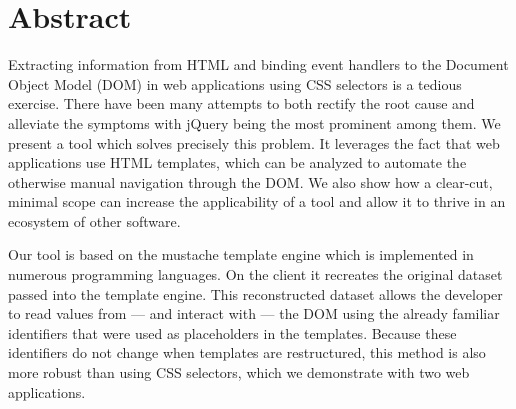 \documentclass[thesis.tex]{subfiles}
\begin{document}
\chapter*{Abstract}
\label{chap:abstract}

Extracting information from HTML and binding event handlers to the
Document Object Model (DOM) in web applications using CSS selectors is a tedious
exercise. There have been many attempts to both rectify the root cause and
alleviate the symptoms with jQuery being the most prominent among them.
We present a tool which solves precisely this problem. It leverages the fact
that web applications use HTML templates, which can be analyzed to automate
the otherwise manual navigation through the DOM.
We also show how a clear-cut, minimal scope can increase the applicability of
a tool and allow it to thrive in an ecosystem of other software.

Our tool is based on the mustache template engine which is implemented in
numerous programming languages.
On the client it recreates the original dataset passed into the template engine.
This reconstructed dataset allows the developer to read values from
--- and interact with --- the DOM using the already familiar identifiers that
were used as placeholders in the templates.
Because these identifiers do not change when templates are restructured,
this method is also more robust than using CSS selectors,
which we demonstrate with two web applications.
\end{document}
